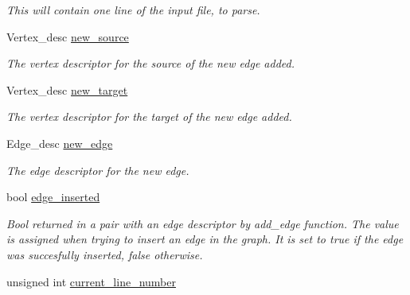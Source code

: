 \begin{DoxyCompactItemize}
\begin{DoxyCompactList}\small\item\em This will contain one line of the input file, to parse. \item\end{DoxyCompactList}\item 
\hypertarget{classreader__base__class_a22708fe953f4e0221270f28f309f80f4}{
Vertex\_\-desc \hyperlink{classreader__base__class_a22708fe953f4e0221270f28f309f80f4}{new\_\-source}}
\label{classreader__base__class_a22708fe953f4e0221270f28f309f80f4}

\begin{DoxyCompactList}\small\item\em The vertex descriptor for the source of the new edge added. \item\end{DoxyCompactList}\item 
\hypertarget{classreader__base__class_a3215bc334e6f5e7ca1601529150e4ce7}{
Vertex\_\-desc \hyperlink{classreader__base__class_a3215bc334e6f5e7ca1601529150e4ce7}{new\_\-target}}
\label{classreader__base__class_a3215bc334e6f5e7ca1601529150e4ce7}

\begin{DoxyCompactList}\small\item\em The vertex descriptor for the target of the new edge added. \item\end{DoxyCompactList}\item 
\hypertarget{classreader__base__class_ab002060e56625ce5d422e811015ae90e}{
Edge\_\-desc \hyperlink{classreader__base__class_ab002060e56625ce5d422e811015ae90e}{new\_\-edge}}
\label{classreader__base__class_ab002060e56625ce5d422e811015ae90e}

\begin{DoxyCompactList}\small\item\em The edge descriptor for the new edge. \item\end{DoxyCompactList}\item 
\hypertarget{classreader__base__class_a59220f3fd7d9ed4effa57d0175f1d420}{
bool \hyperlink{classreader__base__class_a59220f3fd7d9ed4effa57d0175f1d420}{edge\_\-inserted}}
\label{classreader__base__class_a59220f3fd7d9ed4effa57d0175f1d420}

\begin{DoxyCompactList}\small\item\em Bool returned in a pair with an edge descriptor by add\_\-edge function.  The value is assigned when trying to insert an edge in the graph. It is set to true if the edge was succesfully inserted, false otherwise. \item\end{DoxyCompactList}\item 
\hypertarget{classreader__base__class_ab2b9bc60ece613cb7de32b02dae65f15}{
unsigned int \hyperlink{classreader__base__class_ab2b9bc60ece613cb7de32b02dae65f15}{current\_\-line\_\-number}}
\label{classreader__base__class_ab2b9bc60ece613cb7de32b02dae65f15}


\end{DoxyCompactItemize}
